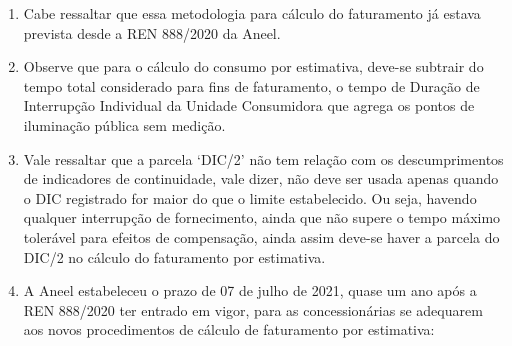 \begin{enumerate}[resume]
{    Em que,
    \begin{itemize}
        \item Carga = potência nominal total do ponto de iluminação em Watts, incluídos os equipamentos auxiliares, conforme art. 473, devendo ser proporcionalizada em caso de alteração durante o ciclo.
        \item Tempo = tempo considerado para o faturamento diário da iluminação pública, podendo assumir os seguintes valores:
        \begin{itemize}
            \item 24h - para os logradouros que necessitem de iluminação permanente; ou
            \item Tempo médio anual por município homologado no Anexo I da Resolução Homologatória REH nº 2.590, de 13 de agosto de 2019;
        \end{itemize}
        \item DIC = Duração de Interrupção Individual da unidade consumidora que agrega os pontos de iluminação pública no último mês disponível, conforme cronograma de apuração da distribuidora, em horas, conforme Módulo 8 do PRODIST;
        \item n = número de dias do mês ou o número de dias decorridos desde a instalação ou alteração do ponto de iluminação. (grifou-se)
    \end{itemize}
}
\item Cabe ressaltar que essa metodologia para cálculo do faturamento já estava prevista desde a REN 888/2020 da Aneel.

\item Observe que para o cálculo do consumo por estimativa, deve-se subtrair do tempo total considerado para fins de faturamento, o tempo de Duração de Interrupção Individual da Unidade Consumidora que agrega os pontos de iluminação pública sem medição.

\item Vale ressaltar que a parcela ‘DIC/2’ não tem relação com os descumprimentos de indicadores de continuidade, vale dizer, não deve ser usada apenas quando o DIC registrado for maior do que o limite estabelecido. Ou seja, havendo qualquer interrupção de fornecimento, ainda que não supere o tempo máximo tolerável para efeitos de compensação, ainda assim deve-se haver a parcela do DIC/2 no cálculo do faturamento por estimativa.

\item A Aneel estabeleceu o prazo de 07 de julho de 2021, quase um ano após a REN 888/2020 ter entrado em vigor, para as concessionárias se adequarem aos novos procedimentos de cálculo de faturamento por estimativa:
\end{enumerate}
